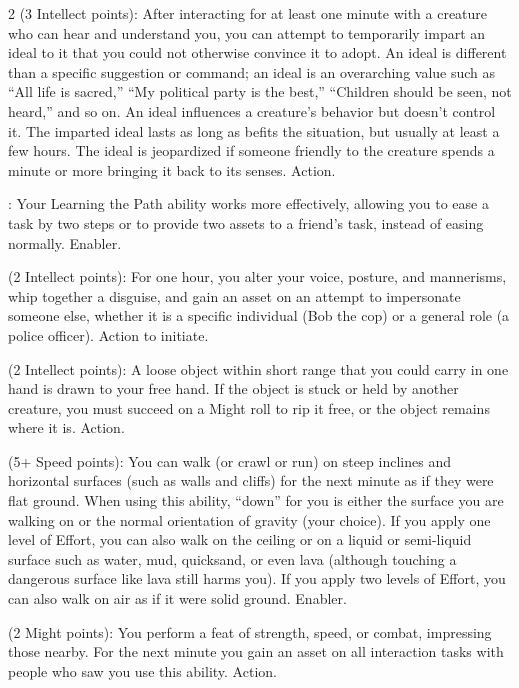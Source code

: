 \begin{multicols}{2}
 (3 Intellect points): After interacting for at least one minute with a creature who can hear and understand you, you can attempt to temporarily impart an ideal to it that you could not otherwise convince it to adopt. An ideal is different than a specific suggestion or command; an ideal is an overarching value such as “All life is sacred,” “My political party is the best,” “Children should be seen, not heard,” and so on. An ideal influences a creature’s behavior but doesn’t control it. The imparted ideal lasts as long as befits the situation, but usually at least a few hours. The ideal is jeopardized if someone friendly to the creature spends a minute or more bringing it back to its senses. Action. 
 
: Your Learning the Path ability works more effectively, allowing you to ease a task by two steps or to provide two assets to a friend’s task, instead of easing normally. Enabler. 
 
(2 Intellect points): For one hour, you alter your voice, posture, and mannerisms, whip together a disguise, and gain an asset on an attempt to impersonate someone else, whether it is a specific individual (Bob the cop) or a general role (a police officer). Action to initiate. 
 
 (2 Intellect points): A loose object within short range that you could carry in one hand is drawn to your free hand. If the object is stuck or held by another creature, you must succeed on a Might roll to rip it free, or the object remains where it is. Action. 
 
 (5+ Speed points): You can walk (or crawl or run) on steep inclines and horizontal surfaces (such as walls and cliffs) for the next minute as if they were flat ground. When using this ability, “down” for you is either the surface you are walking on or the normal orientation of gravity (your choice). If you apply one level of Effort, you can also walk on the ceiling or on a liquid or semi-liquid surface such as water, mud, quicksand, or even lava (although touching a dangerous surface like lava still harms you). If you apply two levels of Effort, you can also walk on air as if it were solid ground. Enabler. 
 
 (2 Might points): You perform a feat of strength, speed, or combat, impressing those nearby. For the next minute you gain an asset on all interaction tasks with people who saw you use this ability. Action. 
 

\end{multicols}
